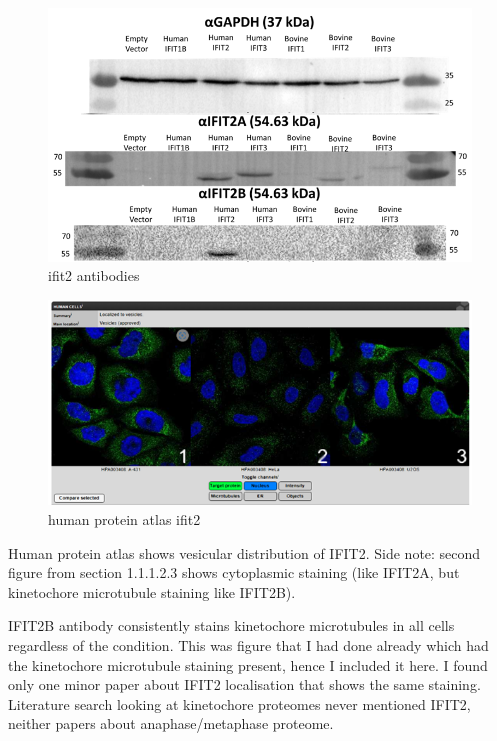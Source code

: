 \begin{figure}
    \centering
    \includegraphics[width=1\linewidth]{10. Chapter 5/Figs/05. IFIT2AB Discussion/01. antibodies ifit2.png}
    \caption[ifit2 antibodies]{ifit2 antibodies}
    \label{fig:ifit2 antibodies}
\end{figure}

\begin{figure}
    \centering
    \includegraphics[width=1\linewidth]{10. Chapter 5/Figs/05. IFIT2AB Discussion/02. human protein atlas ifit2.png}
    \caption[human protein atlas ifit2]{human protein atlas ifit2}
    \label{fig:human protein atlas ifit2}
\end{figure}

Human protein atlas shows vesicular distribution of IFIT2.
Side note: second figure from section 1.1.1.2.3 shows cytoplasmic staining (like IFIT2A, but kinetochore microtubule staining like IFIT2B).

IFIT2B antibody consistently stains kinetochore microtubules in all cells regardless of the condition. This was figure that I had done already which had the kinetochore microtubule staining present, hence I included it here. I found only one minor paper about IFIT2 localisation that shows the same staining. Literature search looking at kinetochore proteomes never mentioned IFIT2, neither papers about anaphase/metaphase proteome.

